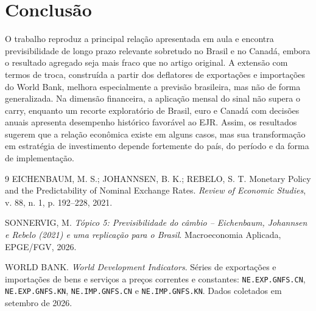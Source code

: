 \documentclass[11pt,a4paper]{article}
\begin{document}
\section{Conclusão}

O trabalho reproduz a principal relação apresentada em aula e encontra previsibilidade de longo prazo relevante sobretudo no Brasil e no Canadá, embora o resultado agregado seja mais fraco que no artigo original. A extensão com termos de troca, construída a partir dos deflatores de exportações e importações do World Bank, melhora especialmente a previsão brasileira, mas não de forma generalizada. Na dimensão financeira, a aplicação mensal do sinal não supera o carry, enquanto um recorte exploratório de Brasil, euro e Canadá com decisões anuais apresenta desempenho histórico favorável ao EJR. Assim, os resultados sugerem que a relação econômica existe em alguns casos, mas sua transformação em estratégia de investimento depende fortemente do país, do período e da forma de implementação.

\begin{thebibliography}{9}
\small
{}
EICHENBAUM, M. S.; JOHANNSEN, B. K.; REBELO, S. T. Monetary Policy and the Predictability of Nominal Exchange Rates. \textit{Review of Economic Studies}, v. 88, n. 1, p. 192--228, 2021.

SONNERVIG, M. \textit{Tópico 5: Previsibilidade do câmbio -- Eichenbaum, Johannsen e Rebelo (2021) e uma replicação para o Brasil}. Macroeconomia Aplicada, EPGE/FGV, 2026.

WORLD BANK. \textit{World Development Indicators}. Séries de exportações e importações de bens e serviços a preços correntes e constantes: \texttt{NE.EXP.GNFS.CN}, \texttt{NE.EXP.GNFS.KN}, \texttt{NE.IMP.GNFS.CN} e \texttt{NE.IMP.GNFS.KN}. Dados coletados em setembro de 2026.
\end{thebibliography}
\end{document}

